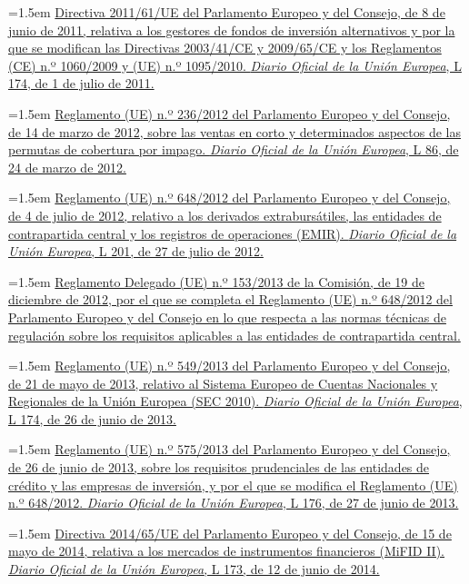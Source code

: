 \documentclass[10pt,a4paper]{article}
\begin{document}
\noindent\hangindent=1.5em \href{https://eur-lex.europa.eu/eli/dir/2011/61/oj}{Directiva 2011/61/UE del Parlamento Europeo y del Consejo, de 8 de junio de 2011, relativa a los gestores de fondos de inversión alternativos y por la que se modifican las Directivas 2003/41/CE y 2009/65/CE y los Reglamentos (CE) n.º 1060/2009 y (UE) n.º 1095/2010. \textit{Diario Oficial de la Unión Europea}, L 174, de 1 de julio de 2011.}

\noindent\hangindent=1.5em \href{https://eur-lex.europa.eu/eli/reg/2012/236/oj}{Reglamento (UE) n.º 236/2012 del Parlamento Europeo y del Consejo, de 14 de marzo de 2012, sobre las ventas en corto y determinados aspectos de las permutas de cobertura por impago. \textit{Diario Oficial de la Unión Europea}, L 86, de 24 de marzo de 2012.}

\noindent\hangindent=1.5em \href{https://eur-lex.europa.eu/eli/reg/2012/648/oj}{Reglamento (UE) n.º 648/2012 del Parlamento Europeo y del Consejo, de 4 de julio de 2012, relativo a los derivados extrabursátiles, las entidades de contrapartida central y los registros de operaciones (EMIR). \textit{Diario Oficial de la Unión Europea}, L 201, de 27 de julio de 2012.}

\noindent\hangindent=1.5em \href{https://eur-lex.europa.eu/legal-content/ES/TXT/?uri=CELEX:32013R0153}{Reglamento Delegado (UE) n.º 153/2013 de la Comisión, de 19 de diciembre de 2012, por el que se completa el Reglamento (UE) n.º 648/2012 del Parlamento Europeo y del Consejo en lo que respecta a las normas técnicas de regulación sobre los requisitos aplicables a las entidades de contrapartida central.}

\noindent\hangindent=1.5em \href{https://eur-lex.europa.eu/eli/reg/2013/549/oj}{Reglamento (UE) n.º 549/2013 del Parlamento Europeo y del Consejo, de 21 de mayo de 2013, relativo al Sistema Europeo de Cuentas Nacionales y Regionales de la Unión Europea (SEC 2010). \textit{Diario Oficial de la Unión Europea}, L 174, de 26 de junio de 2013.}

\noindent\hangindent=1.5em \href{https://eur-lex.europa.eu/eli/reg/2013/575/oj}{Reglamento (UE) n.º 575/2013 del Parlamento Europeo y del Consejo, de 26 de junio de 2013, sobre los requisitos prudenciales de las entidades de crédito y las empresas de inversión, y por el que se modifica el Reglamento (UE) n.º 648/2012. \textit{Diario Oficial de la Unión Europea}, L 176, de 27 de junio de 2013.}

\noindent\hangindent=1.5em \href{https://eur-lex.europa.eu/eli/dir/2014/65/oj}{Directiva 2014/65/UE del Parlamento Europeo y del Consejo, de 15 de mayo de 2014, relativa a los mercados de instrumentos financieros (MiFID II). \textit{Diario Oficial de la Unión Europea}, L 173, de 12 de junio de 2014.}
\end{document}
